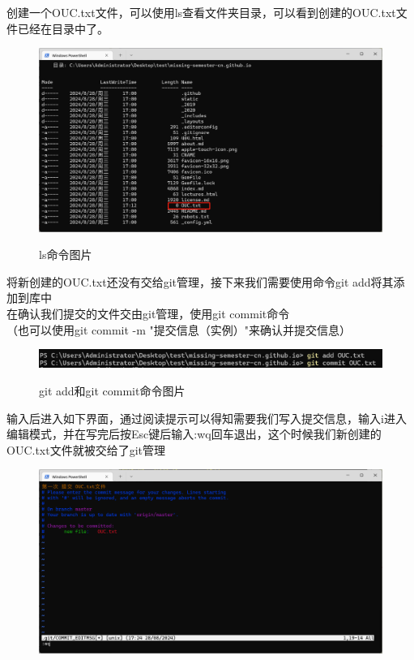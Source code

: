 \documentclass[
    report,     %
    oneside,    %
    UTF8,       %
    zihao=-4    %
]{config} %
\begin{document}
创建一个OUC.txt文件，可以使用ls查看文件夹目录，可以看到创建的OUC.txt文件已经在目录中了。

\begin{figure}[H] %
    \centering %
    \includegraphics[width=0.9\linewidth]{image4.png}
    \caption*{ls命令图片} %
    \caption{} %
    \label{fig:example1} %
\end{figure}
\vspace{-0.7em}  %

将新创建的OUC.txt还没有交给git管理，接下来我们需要使用命令git add将其添加到库中\\
在确认我们提交的文件交由git管理，使用git commit命令\\
（也可以使用git commit -m "提交信息（实例）"来确认并提交信息）

\begin{figure}[H] %
    \centering %
    \includegraphics[width=0.9\linewidth]{image5.png}
    \caption*{git add和git commit命令图片} %
    \caption{} %
    \label{fig:example1} %
\end{figure}
\vspace{-0.7em}  %

输入后进入如下界面，通过阅读提示可以得知需要我们写入提交信息，输入i进入编辑模式，并在写完后按Esc键后输入:wq回车退出，这个时候我们新创建的OUC.txt文件就被交给了git管理

\begin{figure}[H] %
    \centering %
    \includegraphics[width=0.6\linewidth]{image6.png}
    \caption{} %
    \label{fig:example1} %
\end{figure}
\vspace{-0.7em}  %
\end{document}
